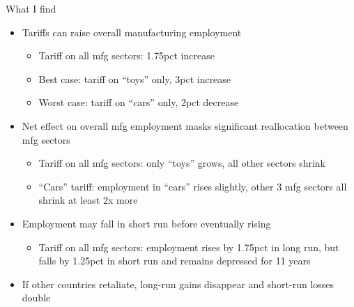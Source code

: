 \documentclass[aspectratio=169,t,10pt,table]{beamer}
\begin{document}
\begin{frame}{What I find}

\begin{itemize}\addtolength{\itemsep}{1ex}
    \item Tariffs can raise overall manufacturing employment
    \begin{itemize}
    \item Tariff on all mfg sectors: 1.75pct increase
        \item Best case: tariff on ``toys'' only, 3pct increase
        \item Worst case: tariff on ``cars'' only, 2pct decrease
    \end{itemize}
    \item Net effect on overall mfg employment masks significant reallocation between mfg sectors
    \begin{itemize}
       \item Tariff on all mfg sectors: only ``toys'' grows, all other sectors shrink
        \item ``Cars'' tariff: employment in ``cars'' rises slightly, other 3 mfg sectors all shrink at least 2x more
    \end{itemize}
    \item Employment may fall in short run before eventually rising
    \begin{itemize}
        \item Tariff on all mfg sectors: employment rises by 1.75pct in long run, but falls by 1.25pct in short run and remains depressed for 11 years
    \end{itemize}
    \item If other countries retaliate, long-run gains disappear and short-run losses double
\end{itemize}

\end{frame}
\end{document}

